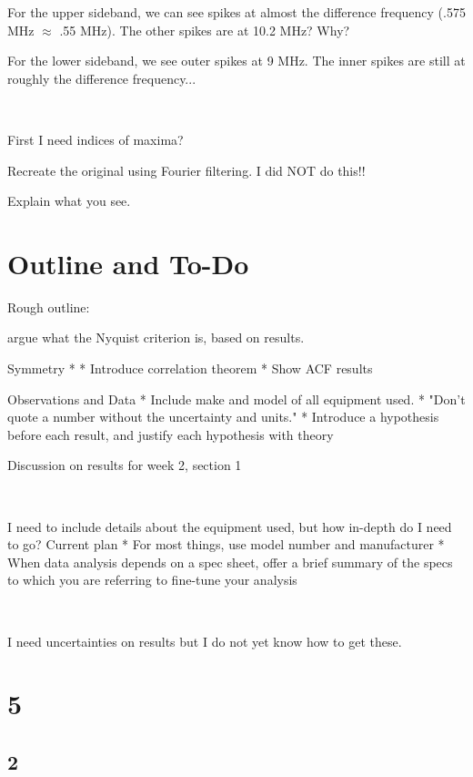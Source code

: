 \documentclass[a4paper]{article}
\begin{document}
For the upper sideband, we can see spikes at almost the difference frequency (.575 MHz $\approx$ .55 MHz). The other spikes are at 10.2 MHz? Why?

For the lower sideband, we see outer spikes at 9 MHz. The inner spikes are still at roughly the difference frequency...

\

First I need indices of maxima?

Recreate the original using Fourier filtering. I did NOT do this!!

Explain what you see.


\section{Outline and To-Do}

Rough outline:

argue what the Nyquist criterion is, based on results.

Symmetry
* 
* Introduce correlation theorem
* Show ACF results

Observations and Data
* Include make and model of all equipment used.
* "Don't quote a number without the uncertainty and units."
* Introduce a hypothesis before each result, and justify each hypothesis with theory


Discussion on results for week 2, section 1

\

I need to include details about the equipment used, but how in-depth do I need to go? Current plan
* For most things, use model number and manufacturer
* When data analysis depends on a spec sheet, offer a brief summary of the specs to which you are referring to fine-tune your analysis

\

I need uncertainties on results but I do not yet know how to get these.

\section{5}

\subsection{2}
\end{document}
